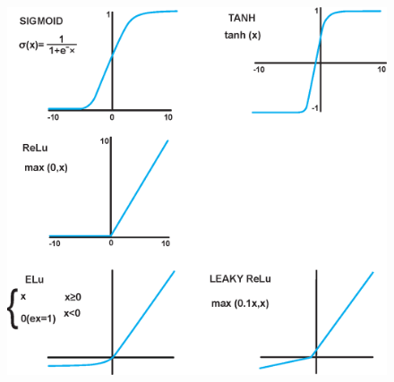             \begin{figure}
                \centering
                
                \includegraphics[width=0.7\linewidth]{figures/background_activation_functions.png}
                

\end{figure}
